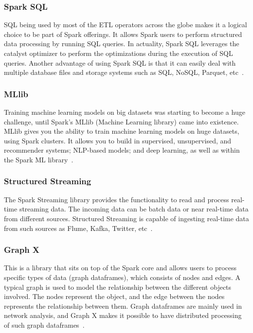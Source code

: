 \documentclass[]{final_report}
\begin{document}
\subsubsection{Spark SQL}

SQL being used by most of the ETL operators across the globe makes it a logical choice to be part of Spark offerings. It allows Spark users to perform structured data processing by running SQL queries. In actuality, Spark SQL leverages the catalyst optimizer to perform the optimizations during the execution of SQL queries. Another advantage of using Spark SQL is that it can easily deal with multiple database files and storage systems such as SQL, NoSQL, Parquet, etc~\cite{singh_manage_2022}.

\subsubsection{MLlib}

Training machine learning models on big datasets was starting to become a huge challenge, until Spark’s MLlib (Machine Learning library) came into existence. MLlib gives you the ability to train machine learning models on
huge datasets, using Spark clusters. It allows you to build in supervised, unsupervised, and recommender systems; NLP-based models; and deep learning, as well as within the Spark ML library~\cite{singh_manage_2022}.


\subsubsection{Structured Streaming}

The Spark Streaming library provides the functionality to read and process real-time streaming data. The incoming data can be batch data or near real-time data from different sources. Structured Streaming is capable of ingesting real-time data from such sources as Flume, Kafka, Twitter, etc~\cite{singh_manage_2022}.

\subsubsection{Graph X}

This is a library that sits on top of the Spark core and allows users to process specific types of data (graph dataframes), which consists of nodes and edges. A typical graph is used to model the relationship between the different objects involved. The nodes represent the object, and the edge between the nodes represents the relationship between them. Graph dataframes are mainly used in network analysis, and Graph X makes it possible to have distributed processing of such graph dataframes~\cite{singh_manage_2022}.
\clearpage
\end{document}
